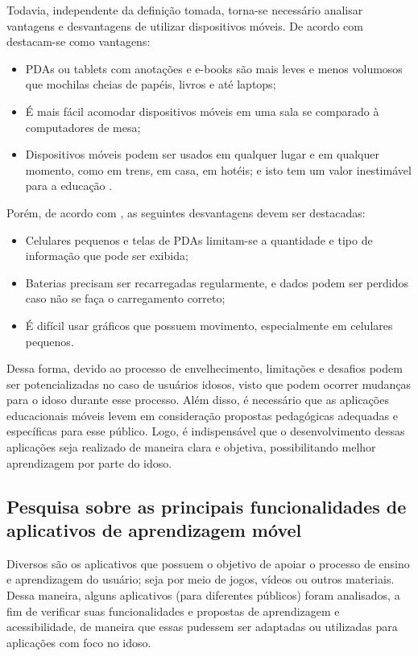 Todavia, independente da definição tomada, torna-se necessário analisar vantagens e desvantagens de utilizar dispositivos móveis. De acordo com \cite{RICHAMEHTA2016} destacam-se como vantagens: 

\begin{itemize}
    \item PDAs ou tablets com anotações e e-books são mais leves e menos volumosos que mochilas cheias de papéis, livros e até laptops;
    \item É mais fácil acomodar dispositivos móveis em uma sala se comparado à computadores de mesa;
    \item Dispositivos móveis podem ser usados em qualquer lugar e em qualquer momento, como em trens, em casa, em hotéis; e isto tem um valor inestimável para a educação \citep{CarmaMaia2008}.
\end{itemize}

Porém, de acordo com \cite{RICHAMEHTA2016}, as seguintes desvantagens devem ser destacadas: 

\begin{itemize}
    \item Celulares pequenos e telas de PDAs limitam-se a quantidade e tipo de informação que pode ser exibida;
    \item Baterias precisam ser recarregadas regularmente, e dados podem ser perdidos caso não se faça o carregamento correto;
    \item É difícil usar gráficos que possuem movimento, especialmente em celulares pequenos.
\end{itemize}

Dessa forma, devido ao processo de envelhecimento, limitações e desafios podem ser potencializadas no caso de usuários idosos, visto que podem ocorrer mudanças para o idoso durante esse processo. Além disso, é necessário que as aplicações educacionais móveis levem em consideração propostas pedagógicas adequadas e específicas para esse público. Logo, é indispensável que o desenvolvimento dessas aplicações seja realizado de maneira clara e objetiva, possibilitando melhor aprendizagem por parte do idoso.

\subsection{Pesquisa sobre as principais funcionalidades de aplicativos de aprendizagem móvel}
Diversos são os aplicativos que possuem o objetivo de apoiar o processo de ensino e aprendizagem do usuário; seja por meio de jogos, vídeos ou outros materiais. Dessa maneira, alguns aplicativos (para diferentes públicos) foram analisados, a fim de verificar suas funcionalidades e propostas de aprendizagem e acessibilidade, de maneira que essas pudessem ser adaptadas ou utilizadas para aplicações com foco no idoso.

